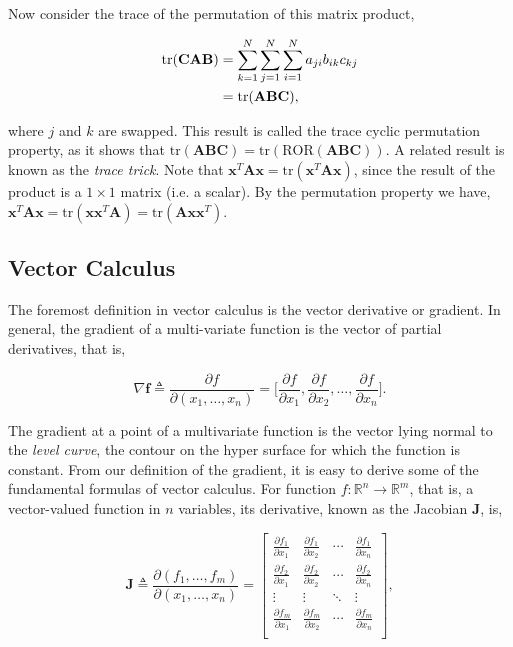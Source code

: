 \documentclass[11pt]{amsart}
\begin{document}
Now consider the trace of the permutation of this matrix product,

\begin{align}
\text{tr}(\mathbf{C}\mathbf{A}\mathbf{B}) &= \sum_{k=1}^N\sum_{j=1}^N\sum_{i=1}^Na_{ji}b_{ik}c_{kj} \notag \\
&= \text{tr}(\mathbf{A}\mathbf{B}\mathbf{C}), \notag
\end{align}

where $j$ and $k$ are swapped. This result is called the trace cyclic permutation property, as it shows that $\text{tr}(\mathbf{A}\mathbf{B}\mathbf{C}) = \text{tr}(\text{ROR}(\mathbf{A}\mathbf{B}\mathbf{C}))$. A related result is known as the \emph{trace trick}. Note that $\mathbf{x}^T\mathbf{A}\mathbf{x} = \text{tr}(\mathbf{x}^T\mathbf{A}\mathbf{x})$, since the result of the product is a $1 \times 1$ matrix (i.e. a scalar). By the permutation property we have, $\mathbf{x}^T\mathbf{A}\mathbf{x} = \text{tr}(\mathbf{x}\mathbf{x}^T\mathbf{A}) = \text{tr}(\mathbf{A}\mathbf{x}\mathbf{x}^T)$.

\subsection{Vector Calculus}

The foremost definition in vector calculus is the vector derivative or gradient. In general, the gradient of a multi-variate function is the vector of partial derivatives, that is,

$$\nabla\mathbf{f} \triangleq \frac{\partial f}{\partial(x_1, \dots, x_n)} = \bigg[\frac{\partial f}{\partial x_{1}}, \frac{\partial f}{\partial x_{2}}, \dots, \frac{\partial f}{\partial x_{n}}\bigg].$$

The gradient at a point of a multivariate function is the vector lying normal to the \emph{level curve}, the contour on the hyper surface for which the function is constant. From our definition of the gradient, it is easy to derive some of the fundamental formulas of vector calculus. For function $f : \mathbb{R}^{n} \to \mathbb{R}^{m}$, that is, a vector-valued function in $n$ variables, its derivative, known as the Jacobian $\mathbf{J}$, is,

$$\mathbf{J} \triangleq \frac{\partial (f_1, \dots, f_m)}{\partial(x_1, \dots, x_n)} = \begin{bmatrix}
\frac{\partial f_1}{\partial x_{1}}&\frac{\partial f_1}{\partial x_{2}}&\cdots&\frac{\partial f_1}{\partial x_{n}}\\
\frac{\partial f_2}{\partial x_{1}}&\frac{\partial f_2}{\partial x_{2}}&\cdots&\frac{\partial f_2}{\partial x_{n}}\\
\vdots & \vdots & \ddots & \vdots \\
\frac{\partial f_m}{\partial x_{1}}&\frac{\partial f_m}{\partial x_{2}}&\cdots&\frac{\partial f_m}{\partial x_{n}}\\
\end{bmatrix},$$
\end{document}
